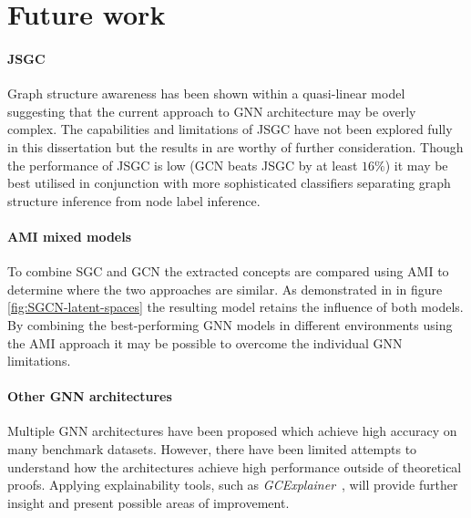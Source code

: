 \section{Future work}
\paragraph{JSGC}
Graph structure awareness has been shown within a quasi-linear model suggesting that the current approach to GNN architecture may be overly complex.
The capabilities and limitations of JSGC have not been explored fully in this dissertation but the results in  are worthy of further consideration.
Though the performance of JSGC is low (GCN beats JSGC by at least $16\%$) it may be best utilised in conjunction with more sophisticated classifiers separating graph structure inference from node label inference.

\paragraph{AMI mixed models}
To combine SGC and GCN the extracted concepts are compared using AMI to determine where the two approaches are similar.
As demonstrated in  in figure \ref{fig:SGCN-latent-spaces} the resulting model retains the influence of both models.
By combining the best-performing GNN models in different environments using the AMI approach it may be possible to overcome the individual GNN limitations.

\paragraph{Other GNN architectures}
Multiple GNN architectures have been proposed which achieve high accuracy on many benchmark datasets.
However, there have been limited attempts to understand how the architectures achieve high performance outside of theoretical proofs.
Applying explainability tools, such as \textit{GCExplainer}~\cite{magister2021gcexplainer}, will provide further insight and present possible areas of improvement.
